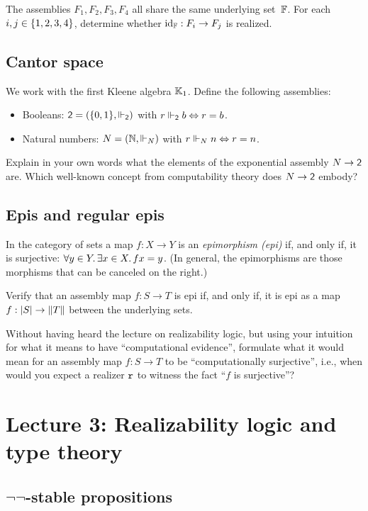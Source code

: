 \documentclass{article}
\begin{document}
The assemblies $F_1, F_2, F_3, F_4$ all share the same underlying set~$\FF$. For each $i, j \in \set{1, 2, 3, 4}$, determine whether $\id[\FF] : F_i \to F_j$ is realized.

\subsection{Cantor space}
\label{sec:cantor-space}

We work with the first Kleene algebra $\klone$. Define the following assemblies:
%
\begin{itemize}
\item Booleans: $\two = (\set{0,1}, {\rz[\two]})$ with $r \rz[\two] b \liff r = b$.
\item Natural numbers: $N = (\NN, {\rz[N]})$ with $r \rz[N] n \liff r = n$.
\end{itemize}
%
Explain in your own words what the elements of the exponential assembly $N \to \two$ are. Which well-known concept from computability theory does $N \to \two$ embody?


\subsection{Epis and regular epis}
\label{sec:epis-regular-epis}

In the category of sets a map $f : X \to Y$ is an \emph{epimorphism (epi)} if, and only if, it is surjective: $\all{y \in Y} \some{x \in X} f x = y$. (In general, the epimorphisms are those morphisms that can be canceled on the right.)

Verify that an assembly map $f : S \to T$ is epi if, and only if, it is epi as a map $f : \S{S} \to \T{T}$ between the underlying sets.

Without having heard the lecture on realizability logic, but using your intuition for what it means to have ``computational evidence'', formulate what it would mean for an assembly map $f : S \to T$ to be ``computationally surjective'', i.e., when would you expect a realizer $\R{r}$ to witness the fact ``$f$ is surjective''?


\section{Lecture 3: Realizability logic and type theory}
\label{sec:lecture-3}


\subsection{$\neg\neg$-stable propositions}
\label{sec:negn-stable-prop}
\end{document}
